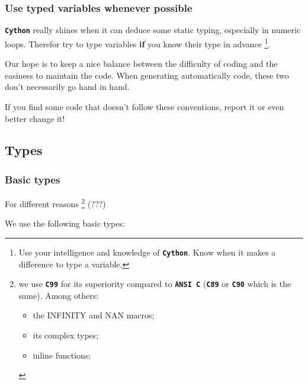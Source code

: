 \documentclass[letterpaper,10pt,english]{sphinxmanual}
\begin{document}
\subsubsection{Use typed variables whenever possible}
\label{cysparse_lib_mainteners:use-typed-variables-whenever-possible}
\textbf{\texttt{Cython}} really shines when it can deduce some static typing, especially in numeric loops. Therefor try to type variables \textbf{if} you know their type in advance \footnote{
Use your intelligence and knowledge of \textbf{\texttt{Cython}}. Know when it makes a difference to type a variable.
}.

Our hope is to keep a nice balance between the difficulty of coding and the easiness to maintain the code. When generating automatically code, these two don't necessarily go hand in hand.

If you find some code that doesn't follow these conventions, report it or even better change it!


\subsection{Types}
\label{cysparse_lib_mainteners:types}

\subsubsection{Basic types}
\label{cysparse_lib_mainteners:basic-types}
For different reasons \footnote{
we use \textbf{\texttt{C99}} for its superiority compared to \textbf{\texttt{ANSI C}} (\textbf{\texttt{C89}} or \textbf{\texttt{C90}} which is the same). Among others:
\begin{itemize}
\item {} 
the INFINITY and NAN macros;

\item {} 
its complex types;

\item {} 
inline functions;

\end{itemize}
} (???)

We use the following basic types:
\end{document}
